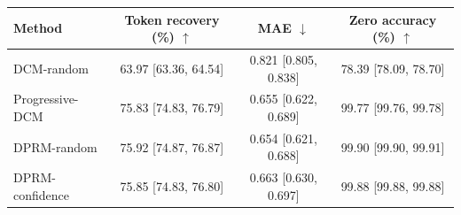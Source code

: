 \begin{tabular}{lccc}
\toprule
\textbf{Method} & \textbf{Token recovery (\%) $\uparrow$} & \textbf{MAE $\downarrow$} & \textbf{Zero accuracy (\%) $\uparrow$} \\
\midrule
DCM-random & 63.97 [63.36, 64.54] & 0.821 [0.805, 0.838] & 78.39 [78.09, 78.70] \\
Progressive-DCM & 75.83 [74.83, 76.79] & 0.655 [0.622, 0.689] & 99.77 [99.76, 99.78] \\
DPRM-random & 75.92 [74.87, 76.87] & 0.654 [0.621, 0.688] & 99.90 [99.90, 99.91] \\
DPRM-confidence & 75.85 [74.83, 76.80] & 0.663 [0.630, 0.697] & 99.88 [99.88, 99.88] \\
\bottomrule
\end{tabular}
